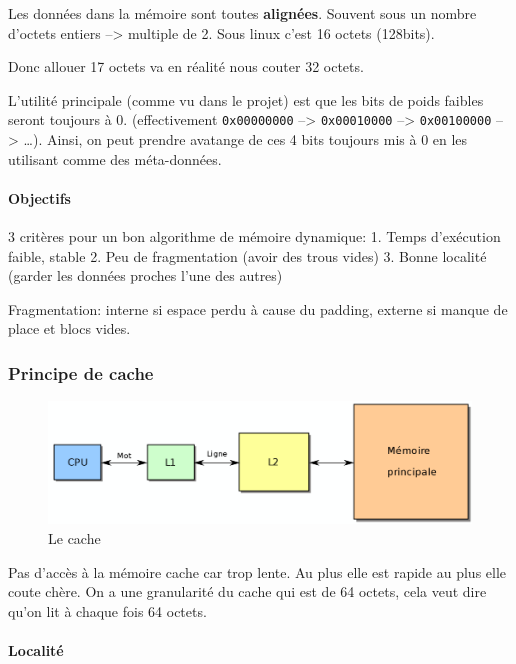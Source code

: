Les données dans la mémoire sont toutes \textbf{alignées}. Souvent sous
un nombre d'octets entiers --\textgreater{} multiple de 2. Sous linux
c'est 16 octets (128bits).

Donc allouer 17 octets va en réalité nous couter 32 octets.

L'utilité principale (comme vu dans le projet) est que les bits de poids
faibles seront toujours à 0. (effectivement \texttt{0x00000000}
--\textgreater{} \texttt{0x00010000} --\textgreater{}
\texttt{0x00100000} --\textgreater{} \ldots). Ainsi, on peut prendre
avatange de ces 4 bits toujours mis à 0 en les utilisant comme des
méta-données.

\paragraph{Objectifs}\label{objectifs}

3 critères pour un bon algorithme de mémoire dynamique: 1. Temps
d'exécution faible, stable 2. Peu de fragmentation (avoir des trous
vides) 3. Bonne localité (garder les données proches l'une des autres)

Fragmentation: interne si espace perdu à cause du padding, externe si
manque de place et blocs vides.

\subsubsection{Principe de cache}\label{principe-de-cache}

\begin{figure}
\centering
\includegraphics{image-49.png}
\caption{Le cache}
\end{figure}

Pas d'accès à la mémoire cache car trop lente. Au plus elle est rapide
au plus elle coute chère. On a une granularité du cache qui est de 64
octets, cela veut dire qu'on lit à chaque fois 64 octets.

\paragraph{Localité}\label{localituxe9}


